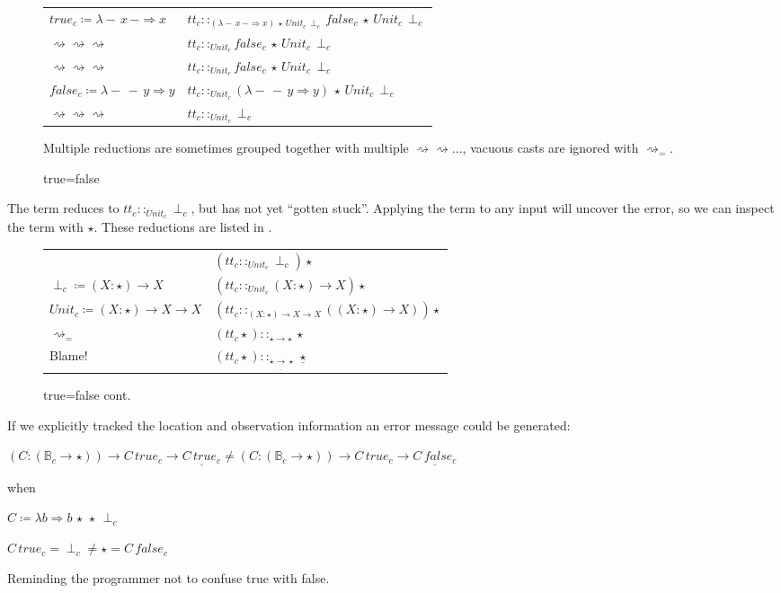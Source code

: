 \begin{sidewaysfigure}
\begin{tabular}{ll}
$true_{c}\coloneqq\lambda-\,x\,-\Rightarrow x$ & $tt_{c}::_{\left(\lambda-\,x\,-\Rightarrow x\right)\,\star\,Unit_{c}\,\perp_{c}}false_{c}\,\star\,Unit_{c}\,\perp_{c}$\tabularnewline

$\rightsquigarrow\rightsquigarrow\rightsquigarrow$ & $tt_{c}::_{Unit_{c}}false_{c}\,\star\,Unit_{c}\,\perp_{c}$\tabularnewline

$\rightsquigarrow\rightsquigarrow\rightsquigarrow$ & $tt_{c}::_{Unit_{c}}false_{c}\,\star\,Unit_{c}\,\perp_{c}$\tabularnewline

$false_{c}\coloneqq\lambda-\,-\,y\Rightarrow y$ & $tt_{c}::_{Unit_{c}}\left(\lambda-\,-\,y \Rightarrow y\right)\,\star\,Unit_{c}\,\perp_{c}$\tabularnewline

$\rightsquigarrow\rightsquigarrow\rightsquigarrow$ & $tt_{c}::_{Unit_{c}}\perp_{c}$\tabularnewline
\end{tabular}
Multiple reductions are sometimes grouped together with multiple $\rightsquigarrow\rightsquigarrow...$, vacuous casts are ignored with $\rightsquigarrow_{=}$.
\caption{true=false}
\label{fig:cast-ex-tf}
\end{sidewaysfigure}

The term reduces to $tt_{c}::_{Unit_{c}}\perp_{c}$, but has not yet ``gotten stuck''.
Applying the term to any input will uncover the error, so we can inspect the term with $\star$.
These reductions are listed in .

\begin{figure}
\begin{tabular}{ll}
& $\left(tt_{c}::_{Unit_{c}}\perp_{c}\right)\star$\tabularnewline
$\perp_{c}\coloneqq\left(X:\star\right)\rightarrow X$ & $\left( tt_{c}::_{Unit_{c}}\left(X:\star\right)\rightarrow X\right)  \star$\tabularnewline

$Unit_{c}\coloneqq\left(X:\star\right)\rightarrow X\rightarrow X$ & $\left( tt_{c}::_{\left(X:\star\right)\rightarrow X\rightarrow X}\left(\left(X:\star\right)\rightarrow X\right)\right)  \star$\tabularnewline

$\rightsquigarrow_{=}$ & $\left(tt_{c}\star\right)::_{\star\rightarrow\star}\star$\tabularnewline
Blame! & $\left(tt_{c}\star\right)::_{\star\underline{\rightarrow}\star}\underline{\star}$\tabularnewline
\end{tabular}
\caption{true=false cont.}
\label{fig:cast-ex-tf-2}
\end{figure}

If we explicitly tracked the location and observation information an error message could be generated:
 
$\left(C:\left(\mathbb{B}_{c}\rightarrow\star\right)\right)\rightarrow C\,true_{c}\rightarrow\underline{C\,true_{c}}
\neq
\left(C:\left(\mathbb{B}_{c}\rightarrow\star\right)\right) \rightarrow C\,true_{c}\rightarrow\underline{C\,false_{c}}$
 
when
 
$C\coloneqq\lambda b \Rightarrow b\,\star\,\star\,\perp_c$
 
$C\, true_c = \perp_c \neq \star = C\, false_c$
 
Reminding the programmer not to confuse true with false.